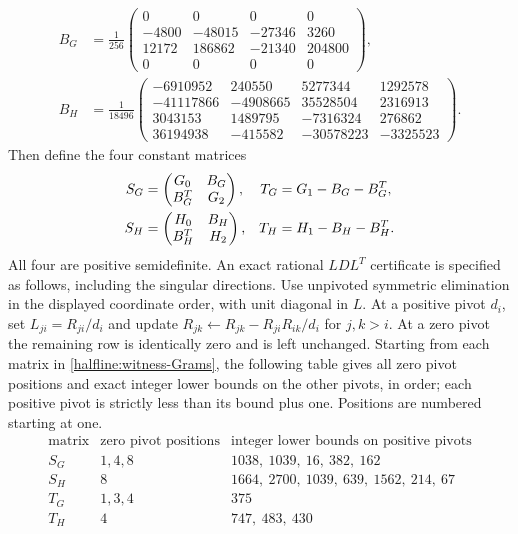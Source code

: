 \begin{align}
 B_G&=\frac1{256}\begin{pmatrix}
 0&0&0&0\\
 -4800&-48015&-27346&3260\\
 12172&186862&-21340&204800\\
 0&0&0&0
 \end{pmatrix},                                      \label{halfline:witness-BG}\\
 B_H&=\frac1{18496}\begin{pmatrix}
 -6910952&240550&5277344&1292578\\
 -41117866&-4908665&35528504&2316913\\
 3043153&1489795&-7316324&276862\\
 36194938&-415582&-30578223&-3325523
 \end{pmatrix}.                                      \label{halfline:witness-BH}
\end{align}
Then define the four constant matrices
\begin{align}
 S_G&=\begin{pmatrix}G_0&B_G\\B_G^T&G_2\end{pmatrix},&
 T_G&=G_1-B_G-B_G^T,\notag\\
 S_H&=\begin{pmatrix}H_0&B_H\\B_H^T&H_2\end{pmatrix},&
 T_H&=H_1-B_H-B_H^T.                                  \label{halfline:witness-Grams}
\end{align}
All four are positive semidefinite. An exact rational $LDL^T$ certificate
is specified as follows, including the singular directions.
Use unpivoted symmetric elimination in the displayed coordinate order,
with unit diagonal in $L$. At a positive pivot $d_i$, set
$L_{ji}=R_{ji}/d_i$ and update
$R_{jk}\leftarrow R_{jk}-R_{ji}R_{ik}/d_i$ for $j,k>i$.
At a zero pivot the remaining row is identically zero and is left
unchanged. Starting from each matrix in
\eqref{halfline:witness-Grams}, the following table gives all zero
pivot positions and exact integer lower bounds on the other pivots,
in order; each positive pivot is strictly less than its bound plus one.
Positions are numbered starting at one.
\[
\begin{array}{c|c|l}
 \text{matrix}&\text{zero pivot positions}&
        \text{integer lower bounds on positive pivots}\\\hline
 S_G&1,4,8&1038,\ 1039,\ 16,\ 382,\ 162\\
 S_H&8&1664,\ 2700,\ 1039,\ 639,\ 1562,\ 214,\ 67\\
 T_G&1,3,4&375\\
 T_H&4&747,\ 483,\ 430
\end{array}
\]
